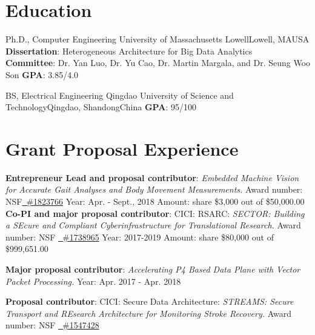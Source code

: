 \documentclass[11pt]{moderncv}
\begin{document}
\section{Education}
        {Ph.D., Computer Engineering}
        {University of Massachusetts Lowell}{Lowell, MA}{USA}
        {\textbf{Dissertation}: Heterogeneous Architecture for Big Data Analytics\\
         \textbf{Committee}: Dr. Yan Luo, Dr. Yu Cao, Dr. Martin Margala, and Dr. Seung Woo Son
         \textbf{GPA}: 3.85/4.0}  %

        {BS, Electrical Engineering}
        {Qingdao University of Science and Technology}{Qingdao, Shandong}{China}
        {\textbf{GPA}: 95/100        
        }

\section{Grant Proposal Experience}

%
{\textbf{Entrepreneur Lead and proposal contributor}: \textit{Embedded Machine Vision for Accurate Gait Analyses and Body Movement Measurements.} \newline
Award number: NSF\href{https://nsf.gov/awardsearch/showAward?AWD_ID=1823766}
  {\color{color2}\homepagesymbol~\#1823766} \newline
Year: Apr. - Sept., 2018 \newline
Amount: share \$3,000 out of \$50,000.00
}
%
{\textbf{Co-PI and major proposal contributor}: CICI: RSARC: \textit{SECTOR: Building a {SE}cure and Compliant {C}yberinfrastructure for {T}ranslati{o}nal {R}esearch.} \newline
Award number: NSF \href{https://nsf.gov/awardsearch/showAward?AWD_ID=1738965}
  {\color{color2}\homepagesymbol~\#1738965} \newline
Year: 2017-2019 \newline
Amount: share \$80,000 out of \$999,651.00
}

%
{\textbf{Major proposal contributor}: \textit{Accelerating P4 Based Data Plane with Vector Packet Processing.} \newline
Year: Apr. 2017 - Apr. 2018
}

%
{\textbf{Proposal contributor}: CICI: Secure Data Architecture: \textit{STREAMS: Secure Transport and REsearch Architecture for Monitoring Stroke Recovery.} \newline
Award number: NSF \href{https://www.nsf.gov/awardsearch/showAward?AWD_ID=1547428}
  {\color{color2}\homepagesymbol~\#1547428} 
}
\end{document}
